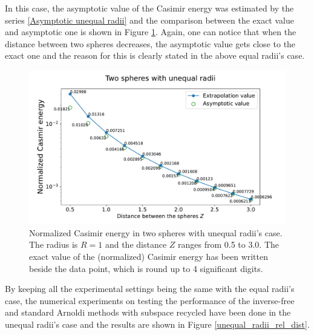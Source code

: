 In this case, the asymptotic value of the Casimir 
energy was estimated by the series \eqref{Asymptotic unequal radii} and the comparison between the exact value and asymptotic one is shown in Figure 
\ref{Casimir energy between spheres with unequal radii}. Again, one can notice that when the distance between two spheres decreases, the asymptotic value gets 
close to the exact one and the reason for this is clearly stated in the above equal radii's case.
\begin{figure}[H]
    \centering
    \includegraphics[scale = 0.5]{figures/Spheres_unequal_CasE.pdf}
    \caption{Normalized Casimir energy in two spheres with unequal radii's case. The radius is $R = 1$ and the distance $Z$ 
    ranges from 0.5 to 3.0. The exact value of the (normalized) Casimir energy has been written 
    beside the data point, which is round up to 4 significant digits.}
    \label{Casimir energy between spheres with unequal radii}
\end{figure}

By keeping all the experimental settings being the same with the equal radii's case, the numerical experiments on testing the performance of the inverse-free and 
standard Arnoldi methods with subspace recycled have been done in the unequal radii's case and the results are shown in Figure \ref{unequal_radii_rel_dist}.

